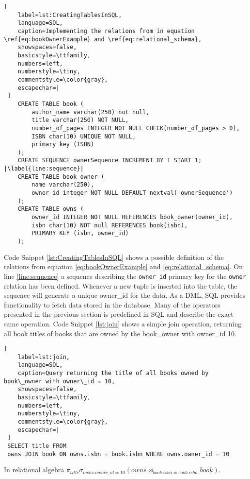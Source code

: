 \begin{lstlisting}[
    label=lst:CreatingTablesInSQL,
    language=SQL,
    caption=Implementing the relations from in equation \ref{eq:bookOwnerExample} and \ref{eq:relational_schema},
    showspaces=false,
    basicstyle=\ttfamily,
    numbers=left,
    numberstyle=\tiny,
    commentstyle=\color{gray},
    escapechar=|
 ]
    CREATE TABLE book (
        author_name varchar(250) not null,
        title varchar(250) NOT NULL,
        number_of_pages INTEGER NOT NULL CHECK(number_of_pages > 0),
        ISBN char(10) UNIQUE NOT NULL,
        primary key (ISBN)
    );
    CREATE SEQUENCE ownerSequence INCREMENT BY 1 START 1; |\label{line:sequence}|
    CREATE TABLE book_owner (
        name varchar(250),
        owner_id integer NOT NULL DEFAULT nextval('ownerSequence')
    );
    CREATE TABLE owns (
        owner_id INTEGER NOT NULL REFERENCES book_owner(owner_id),
        isbn char(10) NOT null REFERENCES book(isbn),
        PRIMARY KEY (isbn, owner_id)
    );
\end{lstlisting}

Code Snippet \ref{lst:CreatingTablesInSQL} shows a possible definition of the relations from equation \ref{eq:bookOwnerExample} and \ref{eq:relational_schema}.
On line \ref{line:sequence} a sequence describing the \texttt{owner\_id} primary key for the \texttt{owner} relation has been defined.
Whenever a new tuple is inserted into the table, the sequence will generate a unique owner\_id for the data.
As a DML, SQL provides functionality to fetch data stored in the database. 
Many of the operators presented in the previous section is predefined in SQL and describe the exact same operation. 
Code Snippet \ref{lst:join} shows a simple join operation, returning all book titles of books that are owned by the book\_owner with owner\_id 10.

\begin{lstlisting}[
    label=lst:join,
    language=SQL,
    caption=Query returning the title of all books owned by book\_owner with owner\_id = 10,
    showspaces=false,
    basicstyle=\ttfamily,
    numbers=left,
    numberstyle=\tiny,
    commentstyle=\color{gray},
    escapechar=|
 ]
 SELECT title FROM
 owns JOIN book ON owns.isbn = book.isbn WHERE owns.owner_id = 10  
\end{lstlisting}

In relational algebra $\pi_{title}\sigma_{owns.owner\_id = 10}(owns \Join_{book.isbn = book.isbn} book )$.

